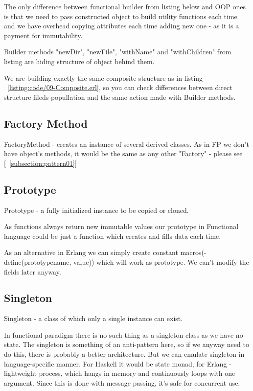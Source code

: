 The only difference between functional builder from listing below and OOP ones is that we need to pass constructed object to build utility functions each time and we have overhead copying attributes each time adding new one - as it is a payment for immutability.

Builder methods "newDir", "newFile", "withName" and "withChildren" from listing are hiding structure of object behind them.

We are building exactly the same composite structure as in listing ~\ref{listing:code/09-Composite.erl}, so you can check differences between direct structure fileds popullation and the same action made with Builder methods.

\subsection{Factory Method} \label{subsection:pattern03}
FactoryMethod - creates an instance of several derived classes. As in FP we don't have object's methods, it would be the same as any other "Factory" - please see [~\ref{subsection:pattern01}]

\subsection{Prototype} \label{subsection:pattern05}
Prototype - a fully initialized instance to be copied or cloned.

As functions always return new immutable values our prototype in Functional language could be just a function which creates and fills data each time.

As an alternative in Erlang we can simply create constant macros(-define(prototypename, value)) which will work as prototype. We can't modify the fields later anyway.

\subsection{Singleton} \label{subsection:pattern06}
Singleton - a class of which only a single instance can exist.

In functional paradigm there is no such thing as a singleton class as we have no state. The singleton is something of an anti-pattern here, so if we anyway need to do this, there is probably a better architecture. But we can emulate singleton in language-specific manner. For Haskell it would be state monad, for Erlang - lightweight process, which hangs in memory and continuously loops with one argument. Since this is done with message passing, it's safe for concurrent use. 

